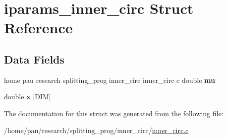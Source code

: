 \hypertarget{structiparams__inner__circ}{
\section{iparams\_\-inner\_\-circ Struct Reference}
\label{structiparams__inner__circ}
}
\subsection*{Data Fields}
\begin{DoxyCompactItemize}
\item 
\hypertarget{structiparams__inner__circ_ab7503c22dbac160380911374276df878}{
home pau research splitting\_\-prog inner\_\-circ inner\_\-circ c double {\bfseries mu}}
\label{structiparams__inner__circ_ab7503c22dbac160380911374276df878}

\item 
\hypertarget{structiparams__inner__circ_acd2fef19c5a0b30fb3fc38dd55615a2c}{
double {\bfseries x} \mbox{[}DIM\mbox{]}}
\label{structiparams__inner__circ_acd2fef19c5a0b30fb3fc38dd55615a2c}

\end{DoxyCompactItemize}


The documentation for this struct was generated from the following file:\begin{DoxyCompactItemize}
\item 
/home/pau/research/splitting\_\-prog/inner\_\-circ/\hyperlink{inner__circ_8c}{inner\_\-circ.c}\end{DoxyCompactItemize}
